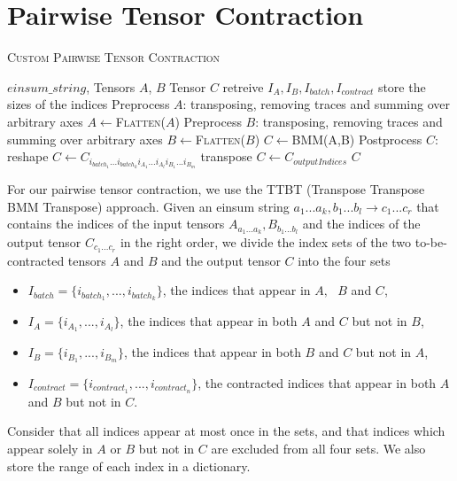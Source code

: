 \section{Pairwise Tensor Contraction}

\begin{algorithm}[H]
\caption{\textsc{Custom Pairwise Tensor Contraction}}
    \label{alg:pc}
\begin{algorithmic}[1]
    \REQUIRE $einsum\_string$, Tensors $A$, $B$
        \ENSURE Tensor $C$
        \STATE retreive $I_A , I_B , I_{batch} , I_{contract}$
        \STATE store the sizes of the indices
        \STATE Preprocess $A$: transposing, removing traces and summing over arbitrary axes
        \STATE $A \leftarrow$\textsc{Flatten}($A$)
        \STATE Preprocess $B$: transposing, removing traces and summing over arbitrary axes
        \STATE $B \leftarrow$\textsc{Flatten}($B$) 
        \STATE $C\leftarrow$\textsc{BMM}(A,B)
        \STATE Postprocess $C$: reshape $C\leftarrow C_{i_{{batch}_1}...i_{{batch}_k} i_{{A}_1} ...i_{{A}_l} i_{B_1} ...i_{B_m}}$
        \STATE transpose $C\leftarrow C_{outputIndices}$
        \RETURN $C$
\end{algorithmic}
\end{algorithm}
For our pairwise tensor contraction, we use the TTBT (Transpose Transpose BMM Transpose) approach.
 Given an einsum string $a_1...a_k,b_1...b_l\rightarrow c_1...c_r$ that contains the indices of the input tensors $A_{a_1...a_k},B_{b_1...b_l}$ and the indices of the output tensor $C_{c_1...c_r}$ in the right order, we divide the index sets of the two to-be-contracted tensors $A$ and $B$ and the output tensor $C$ into the four sets
\begin{itemize}
    \item $I_{batch}= \{i_{{batch}_1},...,i_{{batch}_k}\}$, the indices that appear in $A, \text{ }B$ and $C$,
    \item $I_A=\{i_{{A}_1}, ...,i_{{A}_l}\}$, the indices that appear in both $A$ and $C$ but not in $B$,
    \item $I_B= \{i_{B_1} ,...,i_{B_m}\}$, the indices that appear in both $B$ and $C$ but not in $A$,
    \item $I_{contract} = \{ i_{{contract}_1}, ..., i_{{contract}_n}\}$, the contracted indices that appear in both $A$ and $B$ but not in $C$.
\end{itemize}
Consider that all indices appear at most once in the sets, and that indices which appear solely in $A$ or $B$ but not in $C$ are excluded from all four sets. We also store the range of each index in a dictionary.\\
